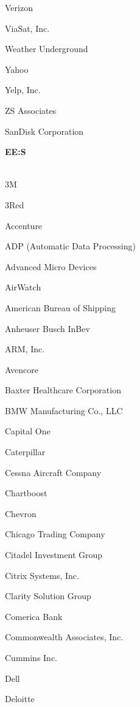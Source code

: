 \documentclass[twoside]{article}
\begin{document}
\begin{center}
\begin{multicols}{5}
\begin{FlushLeft}
\begin{compactitem}
\item Verizon
\item ViaSat, Inc.
\item Weather Underground
\item Yahoo
\item Yelp, Inc.
\item ZS Associates
\item SanDisk Corporation
\end{compactitem}
        \end{FlushLeft}
        \vspace{1em}
        {\fontsize{14}{16}\selectfont \bf EE:S}\\
        \vspace{-1em}
        ~\hrulefill~
        \vspace{-.9em}
        \begin{FlushLeft}
        \begin{compactitem}
        \item 3M
\item 3Red
\item Accenture
\item ADP (Automatic Data Processing)
\item Advanced Micro Devices
\item AirWatch
\item American Bureau of Shipping
\item Anheuser Busch InBev
\item ARM, Inc.
\item Avencore
\item Baxter Healthcare Corporation
\item BMW Manufacturing Co., LLC
\item Capital One
\item Caterpillar
\item Cessna Aircraft Company
\item Chartboost
\item Chevron
\item Chicago Trading Company
\item Citadel Investment Group
\item Citrix Systems, Inc.
\item Clarity Solution Group
\item Comerica Bank
\item Commonwealth Associates, Inc.
\item Cummins Inc.
\item Dell
\item Deloitte

\end{compactitem}
\end{FlushLeft}
\end{multicols}
\end{center}
\end{document}
